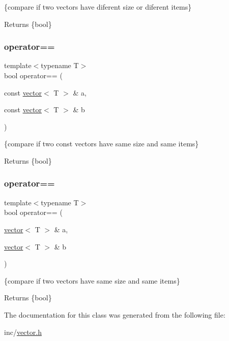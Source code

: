 \{compare if two vectors have diferent size or diferent items\} 

\begin{DoxyReturn}{Returns}
\{bool\} 
\end{DoxyReturn}
\mbox{\label{classvector_a201a9e7f4b5e89f2a6a04f48729ce1f7}} 
\subsubsection{\texorpdfstring{operator==}{operator==}\hspace{0.1cm}{\footnotesize\ttfamily [1/2]}}
{\footnotesize\ttfamily template$<$typename T$>$ \\
bool operator== (\begin{DoxyParamCaption}\item[{const \hyperlink{classvector}{vector}$<$ T $>$ \&}]{a,  }\item[{const \hyperlink{classvector}{vector}$<$ T $>$ \&}]{b }\end{DoxyParamCaption})\hspace{0.3cm}{\ttfamily [friend]}}



\{compare if two const vectors have same size and same items\} 

\begin{DoxyReturn}{Returns}
\{bool\} 
\end{DoxyReturn}
\mbox{\label{classvector_a668214f1413a43739ca682fb958d6d78}} 
\subsubsection{\texorpdfstring{operator==}{operator==}\hspace{0.1cm}{\footnotesize\ttfamily [2/2]}}
{\footnotesize\ttfamily template$<$typename T$>$ \\
bool operator== (\begin{DoxyParamCaption}\item[{\hyperlink{classvector}{vector}$<$ T $>$ \&}]{a,  }\item[{\hyperlink{classvector}{vector}$<$ T $>$ \&}]{b }\end{DoxyParamCaption})\hspace{0.3cm}{\ttfamily [friend]}}



\{compare if two vectors have same size and same items\} 

\begin{DoxyReturn}{Returns}
\{bool\} 
\end{DoxyReturn}


The documentation for this class was generated from the following file\+:\begin{DoxyCompactItemize}
\item 
inc/\hyperlink{vector_8h}{vector.\+h}\end{DoxyCompactItemize}
